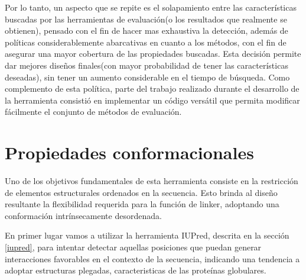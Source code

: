 Por lo tanto, un aspecto que se repite es el solapamiento entre las características buscadas por las herramientas de evaluación(o los resultados que realmente se obtienen), pensado con el fin de hacer mas exhaustiva la detección,
además de políticas considerablemente abarcativas en cuanto a los métodos, con el fin de asegurar una mayor cobertura de las propiedades buscadas.
Esta decisión permite dar mejores diseños finales(con mayor probabilidad de tener las características deseadas), sin tener un aumento considerable en el tiempo de búsqueda.
Como complemento de esta política, parte del trabajo realizado durante el desarrollo de la herramienta consistió en implementar un código versátil que permita modificar fácilmente el conjunto de métodos de evaluación.





\section{Propiedades conformacionales} \label{propiedadesConformacionales}

Uno de los objetivos fundamentales de esta herramienta consiste en la restricción de elementos estructurales ordenados en la secuencia. 
Esto brinda al diseño resultante la flexibilidad requerida para la función de linker, adoptando una conformación intrínsecamente desordenada. 

En primer lugar vamos a utilizar la herramienta IUPred, descrita en la sección \ref{iupred}, para intentar detectar aquellas posiciones que puedan generar interacciones 
favorables en el contexto de la secuencia, indicando una tendencia a adoptar estructuras plegadas, caracteristicas de las proteínas globulares.



